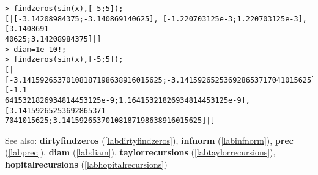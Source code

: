\begin{center}\begin{minipage}{15cm}\begin{Verbatim}[frame=single]
> findzeros(sin(x),[-5;5]);
[|[-3.14208984375;-3.140869140625], [-1.220703125e-3;1.220703125e-3], [3.1408691
40625;3.14208984375]|]
> diam=1e-10!;
> findzeros(sin(x),[-5;5]);
[|[-3.14159265370108187198638916015625;-3.141592652536928653717041015625], [-1.1
6415321826934814453125e-9;1.16415321826934814453125e-9], [3.14159265253692865371
7041015625;3.14159265370108187198638916015625]|]
\end{Verbatim}
\end{minipage}\end{center}
See also: \textbf{dirtyfindzeros} (\ref{labdirtyfindzeros}), \textbf{infnorm} (\ref{labinfnorm}), \textbf{prec} (\ref{labprec}), \textbf{diam} (\ref{labdiam}), \textbf{taylorrecursions} (\ref{labtaylorrecursions}), \textbf{hopitalrecursions} (\ref{labhopitalrecursions})
